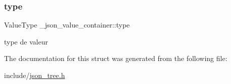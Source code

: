 \subsubsection{\texorpdfstring{type}{type}}
{\footnotesize\ttfamily Value\+Type \+\_\+json\+\_\+value\+\_\+container\+::type}

type de valeur 

The documentation for this struct was generated from the following file\+:\begin{DoxyCompactItemize}
\item 
include/\hyperlink{json__tree_8h}{json\+\_\+tree.\+h}\end{DoxyCompactItemize}
